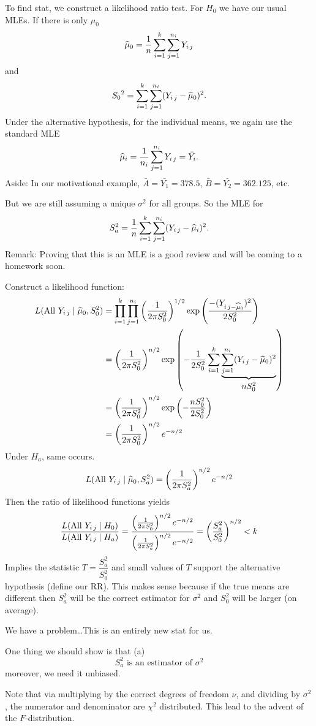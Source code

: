 \nl To find  stat, we construct a likelihood ratio test. For $H_0$ we have our usual MLEs. If there is only $\mu_0$
$$\muh_0 = \over{n} \sum_{i=1}^k \sum_{j=1}^{n_i} Y_{i\,j}$$
and $${S_0}^2 = \sum_{i=1}^k \sum_{j=1}^{n_i} (Y_{i\,j} - \widehat{\mu}_0)^2.$$
Under the alternative hypothesis, for the individual means, we again use the standard MLE
$$\muh_i = \over{n_i}\sum_{j=1}^{n_i} Y_{i\,j} = \bar{Y_i}.$$
Aside: In our motivational example, $\bar{A} = \bar{Y_1} = 378.5$, $\bar{B} = \bar{Y_2} = 362.125$, etc.

\nl But we are still assuming a unique $\sigma^2$ for all groups. So the MLE for $$S_a^2 = \over{n} \sum_{i=1}^k \sum_{j=1}^{n_i} (Y_{i\,j} - \muh_i)^2.$$
Remark: Proving that this is an MLE is a good review and will be coming to a homework soon.

\nl Construct a likelihood function:
\begin{align*}
    L(\text{All } Y_{i\,j} \mid \muh_0, S_0^2) &= \prod_{i=1}^k \prod_{j=1}^{n_i} \pover{2\pi S_0^2}^{1/2} \exp \pfrac{-(Y_{i\,j - \muh_0})^2}{2S_0^2}\\
    &= \pover{2\pi S_0^2}^{n/2} \exp \pars{- \over{2S_0^2} \sum_{i=1}^k \underbrace{\sum_{j=1}^{n_i} (Y_{i\,j} - \muh_0)^2}_{\textstyle nS_0^2}}\\
    &= \pover{2\pi S_0^2}^{n/2} \exp \pars{- \frac{nS_0^2}{2S_0^2}}\\
    &= \pover{2\pi S_0^2}^{n/2} e^{-n/2}
\end{align*}
Under $H_a$, same  occurs.
$$L(\text{All } Y_{i\,j} \mid \muh_0, S_a^2) =  \pover{2\pi S_a^2}^{n/2} e^{-n/2}$$
Then the ratio of likelihood functions yields
$$\frac{
    L(\text{All } Y_{i\,j} \mid H_0)
}{
    L(\text{All } Y_{i\,j} \mid H_a)
} = \frac{
    \pover{2\pi S_0^2}^{n/2} e^{-n/2}
}{
    \pover{2\pi S_a^2}^{n/2} e^{-n/2}
} = \pfrac{S_a^2}{S_0^2}^{n/2} < k$$
Implies the statistic $T = \dfrac{S_a^2}{S_0^2}$ and small values of $T$ support the alternative hypothesis (define our RR). This makes sense because if the true means are different then $S_a^2$ will be the correct estimator for $\sigma^2$ and $S_0^2$ will be larger (on average).

\nl We have a problem\dots This is an entirely new stat for us.

\nl One thing we should show is that (a)
$$S_a^2 \text{ is an estimator of } \sigma^2$$
moreover, we need it unbiased.

\nl Note that via multiplying by the correct degrees of freedom $\nu$, and dividing by $\sigma^2$, the numerator and denominator are $\chi^2$ distributed. This lead to the advent of the $F$-distribution.

